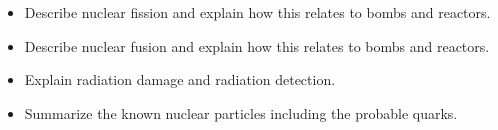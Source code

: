 \documentclass{article}
\begin{document}
\begin{itemize}
\begin{itemize}
\item Describe nuclear fission and explain how this relates to bombs and reactors.

\item Describe nuclear fusion and explain how this relates to bombs and reactors.

\item Explain radiation damage and radiation detection.

\item Summarize the known nuclear particles including the probable quarks.

\end{itemize}

\end{itemize}

\clearpage
\end{document}
